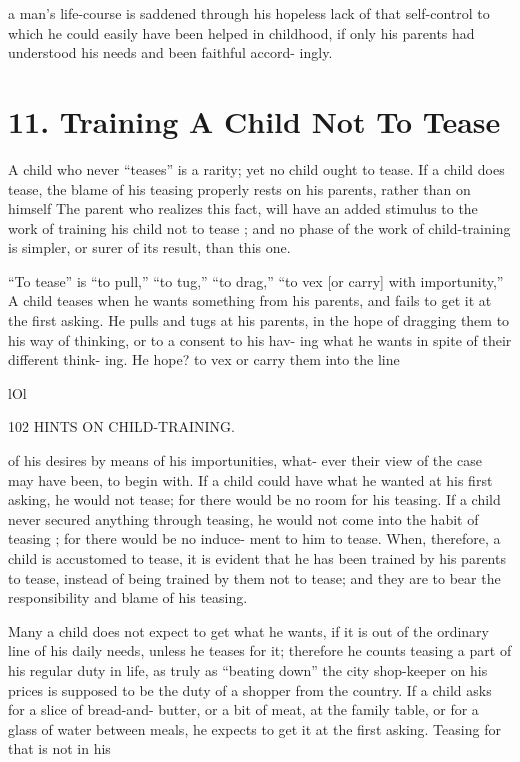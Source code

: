 \documentclass[
]{book}
\begin{document}
a man's life-course is saddened through his hopeless lack of that self-control to which he could easily have been helped in childhood, if only his parents had understood his needs and been faithful accord- ingly.

\hypertarget{training-a-child-not-to-tease}{%
\chapter{11. Training A Child Not To Tease}\label{training-a-child-not-to-tease}}

A child who never ``teases'' is a rarity; yet no child ought to tease. If a child does tease, the blame of his teasing properly rests on his parents, rather than on himself The parent who realizes this fact, will have an added stimulus to the work of training his child not to tease ; and no phase of the work of child-training is simpler, or surer of its result, than this one.

``To tease'' is ``to pull,'' ``to tug,'' ``to drag,'' ``to vex {[}or carry{]} with importunity,'' A child teases when he wants something from his parents, and fails to get it at the first asking. He pulls and tugs at his parents, in the hope of dragging them to his way of thinking, or to a consent to his hav- ing what he wants in spite of their different think- ing. He hope? to vex or carry them into the line

lOl

102 HINTS ON CHILD-TRAINING.

of his desires by means of his importunities, what- ever their view of the case may have been, to begin with. If a child could have what he wanted at his first asking, he would not tease; for there would be no room for his teasing. If a child never secured anything through teasing, he would not come into the habit of teasing ; for there would be no induce- ment to him to tease. When, therefore, a child is accustomed to tease, it is evident that he has been trained by his parents to tease, instead of being trained by them not to tease; and they are to bear the responsibility and blame of his teasing.

Many a child does not expect to get what he wants, if it is out of the ordinary line of his daily needs, unless he teases for it; therefore he counts teasing a part of his regular duty in life, as truly as ``beating down'' the city shop-keeper on his prices is supposed to be the duty of a shopper from the country. If a child asks for a slice of bread-and- butter, or a bit of meat, at the family table, or for a glass of water between meals, he expects to get it at the first asking. Teasing for that is not in his
\end{document}
